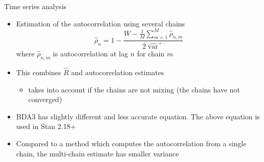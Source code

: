 \documentclass[finnish,english,t]{beamer}
\DeclareMathOperator{\var}{var}
\begin{document}
\begin{frame}{Time series analysis}

  \begin{itemize}
  \item Estimation of the autocorrelation using several chains
    \begin{equation*}
      \hat{\rho}_n=1-\frac{W - \frac{1}{M}\sum_{m=1}^M \hat{\rho}_{n,m}}{2\widehat{\var}^{+}}
    \end{equation*}
    where $\hat{\rho}_{n,m}$ is autocorrelation at lag $n$ for chain $m$
  \item<2-> This combines $\widehat{R}$ and autocorrelation estimates
    \begin{itemize}
    \item takes into account if the chains are not mixing (the chains have not converged)
    \end{itemize}
  \item<3-> BDA3 has slightly different and less accurate equation. The
    above equation is used in Stan 2.18+
  \item<4-> Compared to a method which computes the autocorrelation
    from a single chain, the multi-chain estimate has smaller variance
 \end{itemize}
\end{frame}
\end{document}
